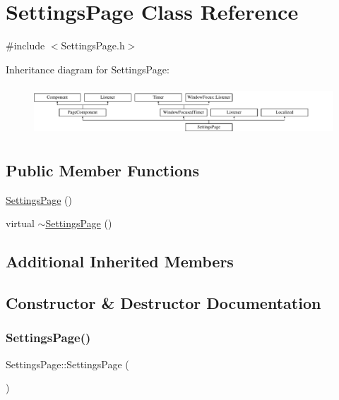 \hypertarget{classSettingsPage}{}\section{Settings\+Page Class Reference}
\label{classSettingsPage}


{\ttfamily \#include $<$Settings\+Page.\+h$>$}

Inheritance diagram for Settings\+Page\+:\begin{figure}[H]
\begin{center}
\leavevmode
\includegraphics[height=1.866667cm]{classSettingsPage}
\end{center}
\end{figure}
\subsection*{Public Member Functions}
\begin{DoxyCompactItemize}
\item 
\mbox{\hyperlink{classSettingsPage_ad9fd5057c635841618e8ceed4cfe40a3}{Settings\+Page}} ()
\item 
virtual \mbox{\hyperlink{classSettingsPage_a8a701f428dab2af143f68bc855555fc0}{$\sim$\+Settings\+Page}} ()
\end{DoxyCompactItemize}
\subsection*{Additional Inherited Members}


\subsection{Constructor \& Destructor Documentation}
\mbox{\label{classSettingsPage_ad9fd5057c635841618e8ceed4cfe40a3}} 
\subsubsection{\texorpdfstring{Settings\+Page()}{SettingsPage()}}
{\footnotesize\ttfamily Settings\+Page\+::\+Settings\+Page (\begin{DoxyParamCaption}{ }\end{DoxyParamCaption})}


